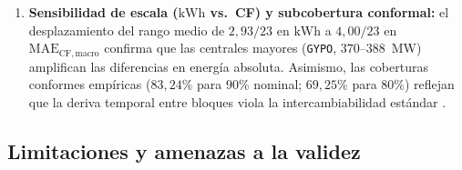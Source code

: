 \begin{enumerate}
    \item \textbf{Sensibilidad de escala ($\text{kWh}$ vs.\ CF) y subcobertura conformal:} el desplazamiento del rango medio de $2{,}93/23$ en $\text{kWh}$ a $4{,}00/23$ en $\mathrm{MAE}_{\mathrm{CF,macro}}$ confirma que las centrales mayores (\texttt{GYPO}, $370$--$388$~MW) amplifican las diferencias en energía absoluta. Asimismo, las coberturas conformes empíricas ($83{,}24\%$ para $90\%$ nominal; $69{,}25\%$ para $80\%$) reflejan que la deriva temporal entre bloques viola la intercambiabilidad estándar \cite{barber2023nonexchangeable}.
\end{enumerate}

\subsection{Limitaciones y amenazas a la validez}\label{sec:limitaciones_gen}

